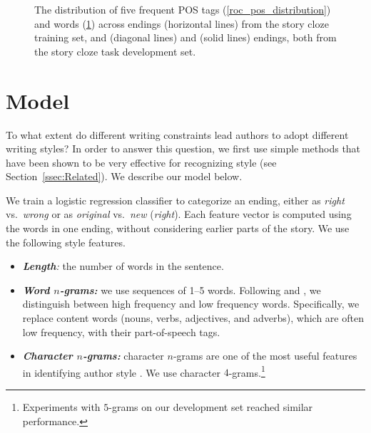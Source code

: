\documentclass[11pt,a4paper]{article}
\newcommand{\secref}[1]{Section~\ref{ssec:#1}}
\newcommand{\isectionb}[1]{\section{#1}\label{ssec:#1}}
\begin{document}
\begin{figure*}[t!]
\begin{small}
{
\label{roc_word_distribution}
}
\end{small}
\caption{The distribution of five frequent POS tags
  (\ref{roc_pos_distribution}) and words (\ref{roc_word_distribution})
  across {} endings (horizontal lines) from the story cloze training set, and
  {} (diagonal lines) and {} (solid lines) endings, both from the story cloze task development set.}

\end{figure*}




\isectionb{Model}

To what extent do
different writing constraints lead authors to adopt different writing styles?
In order to answer this question, we first use simple methods that have been shown to be very effective for recognizing style (see \secref{Related}).
We describe our model below.

We train a logistic regression classifier to categorize an ending,
either as {\it right} vs.~{\it wrong} or as {\it original} vs.~{\it new} ({\it right}).
Each feature vector is computed using the words in one ending, without considering earlier parts of the story. 
We use the following style features.

\begin{itemize}
\item\textit{\textbf{Length}:} the number of words in the sentence.
\item\textit{\textbf{Word $n$-grams:}} we use sequences of 1--5
  words. Following \citet{Tsur:2010} and \citet{Schwartz:2013}, we distinguish between high frequency and low frequency words. 
Specifically, we replace content words (nouns, verbs, adjectives, and adverbs), which are often low frequency, with their part-of-speech tags.
\item\textit{\textbf{Character $n$-grams:}} character $n$-grams are one of the most useful features in identifying author style \cite{Stamatatos:2009}. 
We use character $4$-grams.\footnote{Experiments with $5$-grams on our development set reached similar performance.}
\end{itemize}
\end{document}
